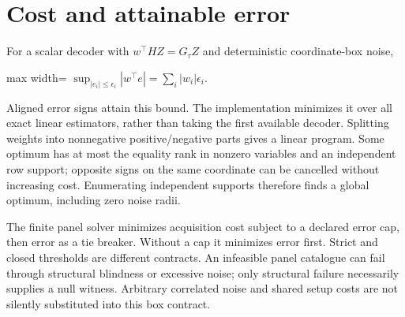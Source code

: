 \documentclass[
  11pt,
  a4paper,
]{report}
\begin{document}
\hypertarget{cost-and-attainable-error}{%
\section{Cost and attainable error}\label{cost-and-attainable-error}}

For a scalar decoder with \(w^\top HZ=G_\tau Z\) and deterministic
coordinate-box noise, \begin{center}
\begin{adjustbox}{max width=\linewidth}
$\displaystyle
\sup_{|e_i|\le\epsilon_i}|w^\top e|
=\sum_i|w_i|\epsilon_i.
$
\end{adjustbox}
\end{center} Aligned error signs attain this bound. The implementation minimizes
it over all exact linear estimators, rather than taking the first
available decoder. Splitting weights into nonnegative positive/negative
parts gives a linear program. Some optimum has at most the equality rank
in nonzero variables and an independent row support; opposite signs on
the same coordinate can be cancelled without increasing cost.
Enumerating independent supports therefore finds a global optimum,
including zero noise radii.

The finite panel solver minimizes acquisition cost subject to a declared
error cap, then error as a tie breaker. Without a cap it minimizes error
first. Strict and closed thresholds are different contracts. An
infeasible panel catalogue can fail through structural blindness or
excessive noise; only structural failure necessarily supplies a null
witness. Arbitrary correlated noise and shared setup costs are not
silently substituted into this box contract.
\end{document}
